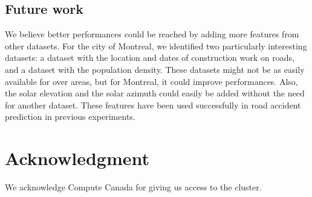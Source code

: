 \documentclass[conference]{IEEEtran}
\begin{document}
\subsection{Future work}
We believe better performances could be reached by adding more features from other datasets. For the city of Montreal, we identified two particularly interesting datasets: a dataset with the location and dates of construction work on roads, and a dataset with the population density. These datasets might not be as easily available for over areas, but for Montreal, it could improve performances. Also, the solar elevation and the solar azimuth could easily be added without the need for another dataset. These features have been used successfully in road accident prediction in previous experiments.

\section*{Acknowledgment}

We acknowledge Compute Canada for giving us access to the cluster.



\end{document}
